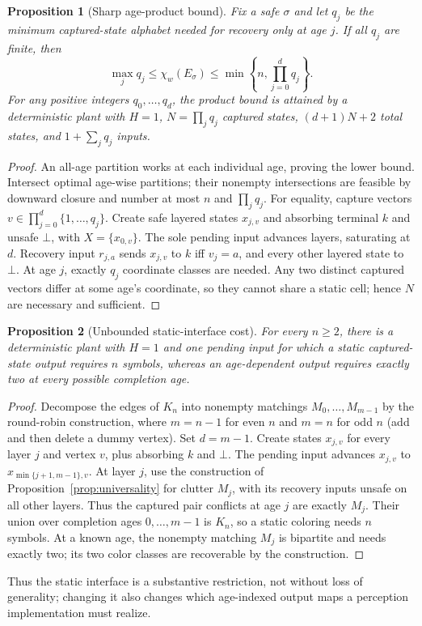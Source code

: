 \documentclass[letterpaper,10pt,conference]{ieeeconf}
\newtheorem{proposition}{Proposition}
\begin{document}
\begin{proposition}[Sharp age-product bound]\label{prop:product}
Fix a safe $\sigma$ and let $q_j$ be the minimum captured-state alphabet needed for recovery only
at age $j$. If all $q_j$ are finite, then
\begin{equation}
 \max_j q_j\le\chi_w(E_\sigma)\le
 \min\left\{n,\prod_{j=0}^d q_j\right\}. \label{eq:product}
\end{equation}
For any positive integers $q_0,\ldots,q_d$, the product bound is attained by a deterministic
plant with $H=1$, $N=\prod_jq_j$ captured states, $(d+1)N+2$ total states, and
$1+\sum_jq_j$ inputs.
\end{proposition}
\begin{proof}
An all-age partition works at each individual age, proving the lower bound. Intersect optimal
age-wise partitions; their nonempty intersections are feasible by downward closure and number at
most $n$ and $\prod_jq_j$. For equality, capture vectors
$v\in\prod_{j=0}^d\{1,\ldots,q_j\}$. Create safe layered states $x_{j,v}$ and absorbing
terminal $k$ and unsafe $\bot$, with $X=\{x_{0,v}\}$. The sole pending input advances layers, saturating at $d$.
Recovery input $r_{j,a}$ sends $x_{j,v}$ to $k$ iff $v_j=a$, and every other layered state to
$\bot$. At age $j$, exactly $q_j$ coordinate classes are needed. Any two distinct captured
vectors differ at some age's coordinate, so they cannot share a static cell; hence $N$ are
necessary and sufficient.
\end{proof}

\begin{proposition}[Unbounded static-interface cost]\label{prop:staticgap}
For every $n\ge2$, there is a deterministic plant with $H=1$ and one pending input for which a
static captured-state output requires $n$ symbols, whereas an age-dependent output requires
exactly two at every possible completion age.
\end{proposition}
\begin{proof}
Decompose the edges of $K_n$ into nonempty matchings $M_0,\ldots,M_{m-1}$ by the round-robin
construction, where $m=n-1$ for even $n$ and $m=n$ for odd $n$ (add and then delete a dummy
vertex). Set $d=m-1$. Create states $x_{j,v}$ for every layer $j$ and vertex $v$, plus absorbing $k$ and
$\bot$. The pending input advances $x_{j,v}$ to $x_{\min\{j+1,m-1\},v}$. At layer $j$, use the
construction of Proposition~\ref{prop:universality} for clutter $M_j$, with its recovery inputs
unsafe on all other layers. Thus the captured pair conflicts at age $j$ are exactly $M_j$.
Their union over completion ages $0,\ldots,m-1$ is $K_n$, so a static coloring needs $n$ symbols.
At a known age, the nonempty matching $M_j$ is bipartite and needs exactly two; its two color
classes are recoverable by the construction.
\end{proof}
Thus the static interface is a substantive restriction, not without loss of generality; changing
it also changes which age-indexed output maps a perception implementation must realize.
\end{document}

